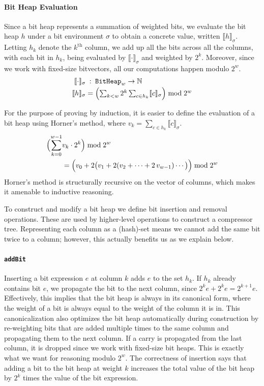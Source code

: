 \documentclass[conference]{IEEEtran}
\newcommand{\sem}[1]{\llbracket #1 \rrbracket}
\newcommand{\csem}[1]{\sem{#1}_{\sigma}}
\newcommand{\Heap}{\ensuremath{\texttt{BitHeap}}\xspace}
\theoremstyle{plain}
\theoremstyle{definition}
\begin{document}
\paragraph*{Bit Heap Evaluation}
Since a bit heap represents a summation of weighted bits,
we evaluate the bit heap $h$ under a bit environment $\sigma$ to obtain a concrete value, written $\csem{h}$.
Letting $h_k$ denote the $k^{\text{th}}$ column, we 
add up all the bits across all the columns, with each bit in $h_k$, 
being evaluated by $\csem{\cdot}$ and weighted by $2^k$. 
Moreover, since we work with fixed-size bitvectors, all our computations happen modulo $2^w$.
\[
\begin{array}{r@{\;}c@{\;}l}
\csem{\cdot} &:& \Heap_w \to \mathbb{N} \\[2pt]
\csem{h}
  &=& \Bigl(\textstyle\sum_{k<w} 2^{k} \sum_{c \in h_k} \csem{c}\Bigr)
      \bmod 2^{w}
\end{array}
\]

For the purpose of proving by induction,
it is easier to define the evaluation of a bit heap using Horner's method,
where $v_k = \sum_{c \in h_k} \csem{c}$.
\begin{equation*}
\begin{split}
  \Bigl( \sum_{k=0}^{w-1} &v_k \cdot 2^{k} \Bigr) \bmod 2^{w}\\
    &= \Bigl( v_0 + 2 \bigl( v_1
      + 2 ( v_2 + \cdots + 2 \, v_{w-1} ) \cdots \bigr) \Bigr) \bmod 2^{w}
\end{split}
\end{equation*}
Horner's method is structurally recursive on the vector of columns, which makes it amenable to inductive reasoning.

To construct and modify a bit heap we define bit insertion and removal operations.
These are used by higher-level operations to construct a compressor tree.
Representing each column as a (hash)-set means we cannot add the same bit twice to a column;
however, this actually benefits us as we explain below.

\paragraph*{\texttt{addBit}}
Inserting a bit expression $e$ at column $k$ adds $e$ to the set $h_k$.
If $h_k$ already contains bit $e$, we propagate the bit to the next column, since $2^{k}e + 2^{k}e = 2^{k+1}e$.
Effectively, this implies that the bit heap is always in its canonical form,
where the weight of a bit is always equal to the weight of the column it is in.
This canonicalization also optimizes the bit heap automatically during construction
by re-weighting bits that are added multiple times to the same column and propagating them to the next column.
If a carry is propagated from the last column, 
it is dropped since we work with fixed-size bit heaps.
This is exactly what we want for reasoning modulo $2^w$.
The correctness of insertion says that adding a bit to the bit heap at weight $k$ 
increases the total value of the bit heap by $2^k$ times the value of the bit expression.
\end{document}
